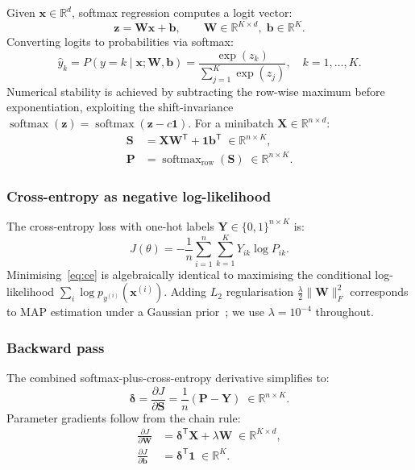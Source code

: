 \documentclass[sigconf,screen,nonacm]{acmart}
\newcommand{\R}{\mathbb{R}}
\newcommand{\1}{\mathbf{1}}
\newcommand{\vone}{\mathbf{1}}
\newcommand{\T}{\mathsf{T}}
\newcommand{\softmax}{\operatorname{softmax}}
\newcommand{\softmaxrow}{\operatorname{softmax}_{\mathrm{row}}}
\newcommand{\vx}{\mathbf{x}}
\newcommand{\vb}{\mathbf{b}}
\newcommand{\vz}{\mathbf{z}}
\newcommand{\mX}{\mathbf{X}}
\newcommand{\mY}{\mathbf{Y}}
\newcommand{\mP}{\mathbf{P}}
\newcommand{\mS}{\mathbf{S}}
\newcommand{\mW}{\mathbf{W}}
\newcommand{\bdelta}{\boldsymbol{\delta}}
\begin{document}
Given $\vx\in\R^d$, softmax regression computes a logit vector:
\begin{equation}\label{eq:logits}
  \vz = \mW\vx + \vb, \qquad \mW\in\R^{K\times d},\;\vb\in\R^K.
\end{equation}
Converting logits to probabilities via softmax:
\begin{equation}\label{eq:softmax}
  \hat{y}_k = P(y{=}k\mid\vx;\mW,\vb)
  = \frac{\exp(z_k)}{\sum_{j=1}^{K}\exp(z_j)}, \quad k=1,\dots,K.
\end{equation}
Numerical stability is achieved by subtracting the row-wise maximum before
exponentiation, exploiting the shift-invariance
$\softmax(\vz)=\softmax(\vz-c\vone)$.  For a minibatch
$\mX\in\R^{n\times d}$:
\begin{align}
  \mS &= \mX\mW^\T + \vone\vb^\T \;\in\R^{n\times K}, \label{eq:sr_scores}\\
  \mP &= \softmaxrow(\mS)          \;\in\R^{n\times K}. \label{eq:sr_probs}
\end{align}

\subsubsection*{Cross-entropy as negative log-likelihood}

The cross-entropy loss with one-hot labels $\mY\in\{0,1\}^{n\times K}$ is:
\begin{equation}\label{eq:ce}
  J(\theta) = -\frac{1}{n}\sum_{i=1}^{n}\sum_{k=1}^{K}
              Y_{ik}\log P_{ik}.
\end{equation}
Minimising~\eqref{eq:ce} is algebraically identical to maximising the
conditional log-likelihood $\sum_{i}\log p_{y^{(i)}}(\vx^{(i)})$.  Adding
$L_2$ regularisation $\frac{\lambda}{2}\|\mW\|_F^2$ corresponds to MAP
estimation under a Gaussian prior~\cite{murphy2022pml, eth_intro_ml}; we use $\lambda=10^{-4}$ throughout.

\subsubsection*{Backward pass}

The combined softmax-plus-cross-entropy derivative simplifies to:
\begin{equation}\label{eq:sr_delta}
  \bdelta = \frac{\partial J}{\partial \mS}
  = \frac{1}{n}(\mP - \mY) \;\in\R^{n\times K}.
\end{equation}
Parameter gradients follow from the chain rule:
\begin{align}
  \frac{\partial J}{\partial \mW} &= \bdelta^\T\mX + \lambda\mW
    \;\in\R^{K\times d}, \label{eq:sr_dW}\\[3pt]
  \frac{\partial J}{\partial \vb} &= \bdelta^\T\vone
    \;\in\R^{K}. \label{eq:sr_db}
\end{align}
\end{document}
